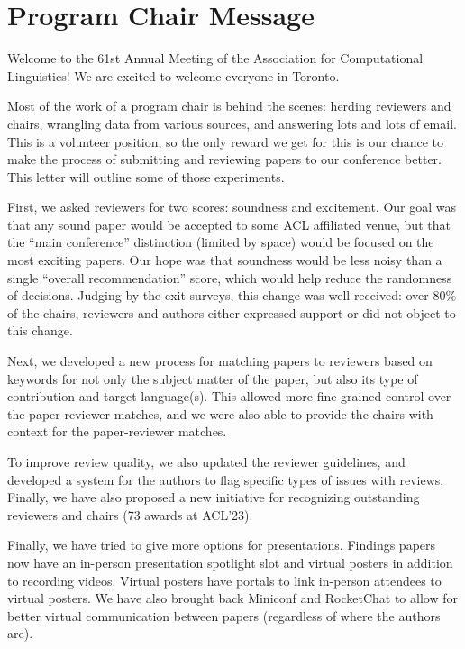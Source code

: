 \section{Program Chair Message}

Welcome to the 61st Annual Meeting of the Association for Computational Linguistics! We are excited to welcome everyone in Toronto.  

Most of the work of a program chair is behind the scenes: herding reviewers and chairs, wrangling data from various sources, and answering lots and lots of email. This is a volunteer position, so the only reward we get for this is our chance to make the process of submitting and reviewing papers to our conference better. This letter will outline some of those experiments.  

First, we asked reviewers for two scores: soundness and excitement.  Our goal was that any sound paper would be accepted to some ACL affiliated venue, but that the ``main conference'' distinction (limited by space) would be focused on the most exciting papers.  Our hope was that soundness would be less noisy than a single ``overall recommendation'' score, which would help reduce the randomness of decisions. Judging by the exit surveys, this change was well received: over 80\% of the chairs, reviewers and authors either expressed support or did not object to this change.

Next, we developed a new process for matching papers to reviewers based on keywords for not only the subject matter of the paper, but also its type of contribution and target language(s). This allowed more fine-grained control over the paper-reviewer matches, and we were also able to provide the chairs with context for the paper-reviewer matches.  

To improve review quality, we also updated the reviewer guidelines, and developed a system for the authors to flag specific types of issues with reviews. Finally, we have also proposed a new initiative for recognizing outstanding reviewers and chairs (73 awards at ACL'23).

Finally, we have tried to give more options for presentations.  Findings papers now have an in-person presentation spotlight slot and virtual posters in addition to recording videos.  Virtual posters have portals to link in-person attendees to virtual posters.  We have also brought back Miniconf and RocketChat to allow for better virtual communication between papers (regardless of where the authors are).

